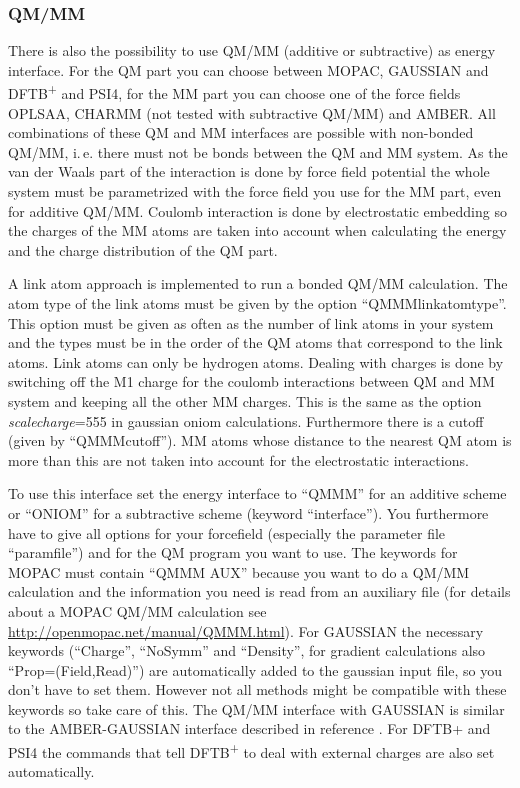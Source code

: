 \documentclass[10pt,a4paper]{article} %
\begin{document}
\subsubsection{QM/MM}

There is also the possibility to use QM/MM (additive or subtractive) as energy interface. For the QM part you can choose between MOPAC, GAUSSIAN and DFTB\textsuperscript{+} and PSI4, for the MM part you can choose one of the force fields OPLSAA, CHARMM (not tested with subtractive QM/MM) and AMBER. All combinations of these QM and MM interfaces are possible with non-bonded QM/MM, i.\,e. there must not be bonds between the QM and MM system. As the van der Waals part of the interaction is done by force field potential the whole system must be parametrized with the force field you use for the MM part, even for additive QM/MM. Coulomb interaction is done by electrostatic embedding so the charges of the MM atoms are taken into account when calculating the energy and the charge distribution of the QM part.

A link atom approach is implemented to run a bonded QM/MM calculation. The atom type of the link atoms must be given by the option ``QMMMlinkatomtype''. This option must be given as often as the number of link atoms in your system and the types must be in the order of the QM atoms that correspond to the link atoms. Link atoms can only be hydrogen atoms. Dealing with charges is done by switching off the M1 charge for the coulomb interactions between QM and MM system and keeping all the other MM charges. This is the same as the option \textit{scalecharge}=555 in gaussian oniom calculations. Furthermore there is a cutoff (given by ``QMMMcutoff''). MM atoms whose distance to the nearest QM atom is more than this are not taken into account for the electrostatic interactions.

To use this interface set the energy interface to ``QMMM'' for an additive scheme or ``ONIOM'' for a subtractive scheme (keyword ``interface''). You furthermore have to give all options for your forcefield (especially the parameter file ``paramfile'') and for the QM program you want to use. The keywords for MOPAC must contain ``QMMM AUX'' because you want to do a QM/MM calculation and the information you need is read from an auxiliary file (for details about a MOPAC QM/MM calculation see \url{http://openmopac.net/manual/QMMM.html}). For GAUSSIAN the necessary keywords (``Charge'', ``NoSymm'' and ``Density'', for gradient calculations also ``Prop=(Field,Read)'') are automatically added to the gaussian input file, so you don't have to set them. However not all methods might be compatible with these keywords so take care of this. The QM/MM interface with GAUSSIAN is similar to the AMBER-GAUSSIAN interface described in reference \cite{okamoto_minimal_2011}. For DFTB+ and PSI4 the commands that tell DFTB\textsuperscript{+} to deal with external charges are also set automatically.
\end{document}

